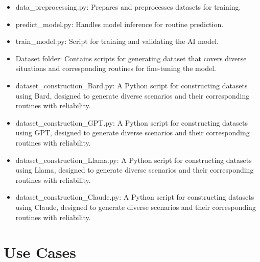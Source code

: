 \documentclass[conference]{IEEEtran}
\begin{document}
\begin{enumerate}[label=\arabic*]
\begin{itemize}[label=-]
        \item data\_preprocessing.py: Prepares and preprocesses datasets for training.
        \vspace{0.7em}

        \item predict\_model.py: Handles model inference for routine prediction.
        \vspace{0.7em}

        \item train\_model.py: Script for training and validating the AI model.
        \vspace{0.7em}

        \item Dataset folder: Contains scripts for generating dataset that covers diverse situations and corresponding routines for fine-tuning the model.
        \vspace{0.7em}

        \item dataset\_construction\_Bard.py: A Python script for constructing datasets using Bard, designed to generate diverse scenarios and their corresponding routines with reliability.
        \vspace{0.7em}

        \item dataset\_construction\_GPT.py: A Python script for constructing datasets using GPT, designed to generate diverse scenarios and their corresponding routines with reliability.
        \vspace{0.7em}

        \item dataset\_construction\_Llama.py: A Python script for constructing datasets using Llama, designed to generate diverse scenarios and their corresponding routines with reliability.
        \vspace{0.7em}

        \item dataset\_construction\_Claude.py: A Python script for constructing datasets using Claude, designed to generate diverse scenarios and their corresponding routines with reliability.
        \vspace{0.7em}        
    \end{itemize}
\end{enumerate}

\vspace{1em} %

\section{Use Cases}
\end{document}

